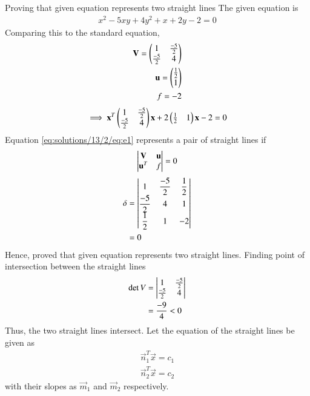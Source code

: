 {Proving that given equation represents two straight lines}
The given equation is
\begin{align}\label{eq:solutions/13/2/eq:e1}
    x^2-5xy+4y^2+x+2y-2=0
\end{align}
Comparing this to the standard equation,
\begin{align}
    \mathbf{V} = \begin{pmatrix}1 & \frac{-5}{2} \\ \frac{-5}{2} & 4\end{pmatrix}\\
    \mathbf{u} = \begin{pmatrix}\frac{1}{2} \\ 1\end{pmatrix}\\
    f = -2
\end{align}
\begin{align}\label{eq:solutions/13/2/eq:e3}
    \implies\mathbf{x}^T\begin{pmatrix}1 & \frac{-5}{2} \\ \frac{-5}{2} & 4\end{pmatrix}\mathbf{x} + 2\begin{pmatrix}\frac{1}{2} & 1\end{pmatrix}\mathbf{x} -2 = 0
\end{align}
Equation \eqref{eq:solutions/13/2/eq:e1} represents a pair of straight lines if
\begin{align}
    \label{eq:solutions/13/2/eq:det}\begin{vmatrix}\mathbf{V} & \mathbf{u}\\ \mathbf{u}^T & f\end{vmatrix}=0
\end{align}
\begin{align}
    \delta & = \begin{vmatrix}1 & \dfrac{-5}{2} & \dfrac{1}{2} \\ \dfrac{-5}{2} & 4 & 1 \\ \dfrac{1}{2} & 1 & -2\end{vmatrix} \\ & = 0
\end{align}
Hence, proved that given equation represents two straight lines.
{Finding point of intersection between the straight lines}
\begin{align}
    \det V & = \begin{vmatrix}1 & \frac{-5}{2}\\ \frac{-5}{2} & 4\end{vmatrix}\\ & = \frac{-9}{4} < 0
\end{align}
Thus, the two straight lines intersect. Let the equation of the straight lines be given as
\begin{align}
    \label{eq:solutions/13/2/eq:line1}\vec{n}_1^T\vec{x}=c_1 \\
    \label{eq:solutions/13/2/eq:line2}\vec{n}_2^T\vec{x}=c_2
\end{align}
with their slopes as $\vec{m}_1$ and $\vec{m}_2$ respectively.

